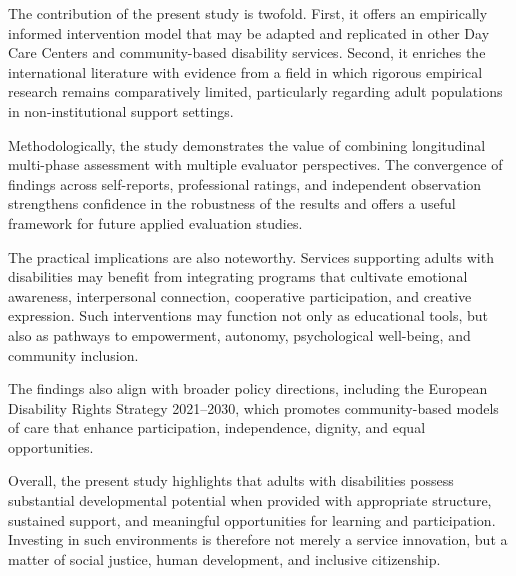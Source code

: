 \documentclass[journal]{IEEEtran}
\begin{document}
The contribution of the present study is twofold. First, it offers an empirically informed intervention model that may be adapted and replicated in other Day Care Centers and community-based disability services. Second, it enriches the international literature with evidence from a field in which rigorous empirical research remains comparatively limited, particularly regarding adult populations in non-institutional support settings.

Methodologically, the study demonstrates the value of combining longitudinal multi-phase assessment with multiple evaluator perspectives. The convergence of findings across self-reports, professional ratings, and independent observation strengthens confidence in the robustness of the results and offers a useful framework for future applied evaluation studies.

The practical implications are also noteworthy. Services supporting adults with disabilities may benefit from integrating programs that cultivate emotional awareness, interpersonal connection, cooperative participation, and creative expression. Such interventions may function not only as educational tools, but also as pathways to empowerment, autonomy, psychological well-being, and community inclusion.

The findings also align with broader policy directions, including the European Disability Rights Strategy 2021--2030, which promotes community-based models of care that enhance participation, independence, dignity, and equal opportunities.

Overall, the present study highlights that adults with disabilities possess substantial developmental potential when provided with appropriate structure, sustained support, and meaningful opportunities for learning and participation. Investing in such environments is therefore not merely a service innovation, but a matter of social justice, human development, and inclusive citizenship.



\end{document}

